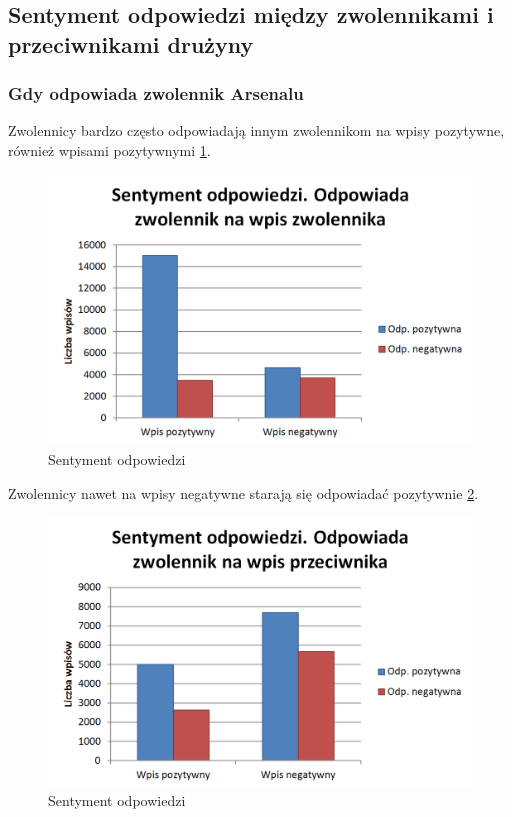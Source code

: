 \subsection{Sentyment odpowiedzi między zwolennikami i przeciwnikami drużyny}

\subsubsection{Gdy odpowiada zwolennik Arsenalu}

Zwolennicy bardzo często odpowiadają innym zwolennikom na wpisy pozytywne,
również wpisami pozytywnymi \ref{image:reply-sentiment-zwolennik-zwolennik}.
\begin{figure}[ht!]
\centering
\includegraphics[width=120mm]{img/reply-sentiment-zwolennik-zwolennik.png}
\caption{Sentyment odpowiedzi}
\label{image:reply-sentiment-zwolennik-zwolennik}
\end{figure}

Zwolennicy nawet na wpisy negatywne starają się odpowiadać pozytywnie
 \ref{image:reply-sentiment-zwolennik-przeciwnik}.
 
\begin{figure}[ht!]
\centering
\includegraphics[width=120mm]{img/reply-sentiment-zwolennik-przeciwnik.png}
\caption{Sentyment odpowiedzi}
\label{image:reply-sentiment-zwolennik-przeciwnik}
\end{figure}


